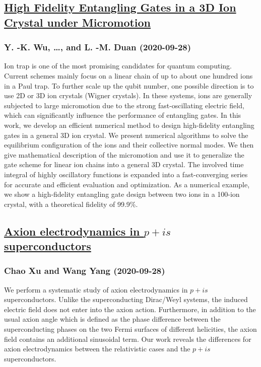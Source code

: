 \subsection*{\href{http://arxiv.org/abs/2009.13007v1}{High Fidelity Entangling Gates in a 3D Ion Crystal under Micromotion}}
\subsubsection*{Y. -K. Wu, \dots, and L. -M. Duan (2020-09-28)}
Ion trap is one of the most promising candidates for quantum computing.
Current schemes mainly focus on a linear chain of up to about one hundred ions
in a Paul trap. To further scale up the qubit number, one possible direction is
to use 2D or 3D ion crystals (Wigner crystals). In these systems, ions are
generally subjected to large micromotion due to the strong fast-oscillating
electric field, which can significantly influence the performance of entangling
gates. In this work, we develop an efficient numerical method to design
high-fidelity entangling gates in a general 3D ion crystal. We present
numerical algorithms to solve the equilibrium configuration of the ions and
their collective normal modes. We then give mathematical description of the
micromotion and use it to generalize the gate scheme for linear ion chains into
a general 3D crystal. The involved time integral of highly oscillatory
functions is expanded into a fast-converging series for accurate and efficient
evaluation and optimization. As a numerical example, we show a high-fidelity
entangling gate design between two ions in a 100-ion crystal, with a
theoretical fidelity of 99.9\%.

\subsection*{\href{http://arxiv.org/abs/2009.12998v1}{Axion electrodynamics in $p+is$ superconductors}}
\subsubsection*{Chao Xu and Wang Yang (2020-09-28)}
We perform a systematic study of axion electrodynamics in $p+is$
superconductors. Unlike the superconducting Dirac/Weyl systems, the induced
electric field does not enter into the axion action. Furthermore, in addition
to the usual axion angle which is defined as the phase difference between the
superconducting phases on the two Fermi surfaces of different helicities, the
axion field contains an additional sinusoidal term. Our work reveals the
differences for axion electrodynamics between the relativistic cases and the
$p+is$ superconductors.

